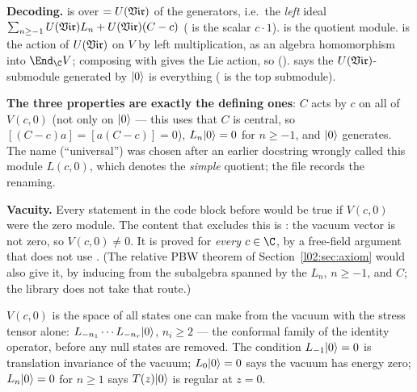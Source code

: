 \begin{dictionary}
\textbf{Decoding.}  is  over  $=U(\mathfrak{Vir})$ of
the generators, i.e.\ the \emph{left} ideal $\sum_{n\ge-1}U(\mathfrak{Vir})L_n + U(\mathfrak{Vir})(C-c)$
( is the scalar $c\cdot 1$).  is the quotient module.
 is the action of $U(\mathfrak{Vir})$ on $V$ by left multiplication, as an
algebra homomorphism into $\End_\C V$; composing with  gives the Lie action, so
 ().  says the
$U(\mathfrak{Vir})$-submodule generated by $|0\rangle$ is everything ( is the top submodule).

\textbf{The three properties are exactly the defining ones}: $C$ acts by $c$ on all of $V(c,0)$
(not only on $|0\rangle$ --- this uses that $C$ is central, so $[(C-c)a] = [a(C-c)] = 0$),
$L_n|0\rangle = 0$ for $n\ge -1$, and $|0\rangle$ generates. The name  (``universal'')
was chosen after an earlier docstring wrongly called this module $L(c,0)$, which denotes the
\emph{simple} quotient; the file records the renaming.

\textbf{Vacuity.} Every statement in the code block before  would be true
if $V(c,0)$ were the zero module. The content that excludes this is : the
vacuum vector is not zero, so $V(c,0)\ne0$. It is proved for \emph{every} $c\in\C$, by a free-field
argument that does not use . (The relative PBW theorem of
Section~\ref{l02:sec:axiom} would also give it, by inducing from the subalgebra spanned by the
$L_n$, $n\ge-1$, and $C$; the library does not take that route.)
\end{dictionary}

\begin{physics}
$V(c,0)$ is the space of all states one can make from the vacuum with the stress tensor alone:
$L_{-n_1}\cdots L_{-n_r}|0\rangle$, $n_i\ge2$ --- the conformal family of the identity operator,
before any null states are removed. The condition $L_{-1}|0\rangle = 0$ is translation invariance
of the vacuum; $L_0|0\rangle = 0$ says the vacuum has energy zero; $L_n|0\rangle=0$ for $n\ge1$
says $T(z)|0\rangle$ is regular at $z=0$.
\end{physics}

